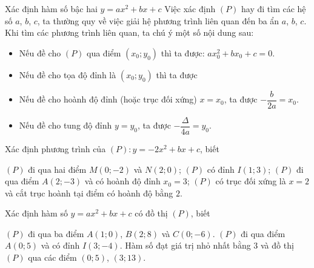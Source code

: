 \begin{dang}{Xác định hàm số bậc hai $y=ax^2+bx+c$}
	Việc xác định $(P)$ hay đi tìm các hệ số $a$, $b$, $c$, ta thường quy về việc giải hệ phương trình liên quan đến ba ẩn  $a$, $b$, $c$. Khi tìm các phương trình liên quan, ta chú ý một số nội dung sau:
	\begin{itemize}
		\item[\iconMT] Nếu đề cho $(P)$ qua điểm $(x_0;y_0)$ thì ta được: $ax_0^2+bx_0+c=0$.
		\item[\iconMT] Nếu đề cho tọa độ đỉnh là $(x_0;y_0)$ thì ta được
		\item[\iconMT] Nếu đề cho hoành độ đỉnh (hoặc trục đối xứng) $x=x_0$, ta được $-\dfrac{b}{2a}=x_0$.
		\item[\iconMT] Nếu đề cho tung độ đỉnh $y=y_0$, ta được $-\dfrac{\Delta}{4a}=y_0$.
	\end{itemize}
\end{dang}
\begin{vd}
	Xác định phương trình của $(P)\colon y=-2x^2+bx+c$, biết
	\begin{tasks}
		\task $(P)$ đi qua hai điểm $M(0;-2)$ và $N(2;0)$;
		\task $(P)$ có đỉnh $I(1;3)$;
		\task $(P)$ đi qua điểm $A(2;-3)$ và có hoành độ đỉnh $x_0=3$;
		\task $(P)$ có trục đối xứng là $x=2$ và cắt trục hoành tại điểm có hoành độ bằng $2$.
	\end{tasks}
\end{vd}

\begin{vd}
	Xác định hàm số $y=ax^2+bx+c$ có đồ thị $(P)$, biết 
	\begin{tasks}
		\task $(P)$ đi qua ba điểm $A(1;0)$, $B(2;8)$ và $C(0;-6)$.
		\task $(P)$ đi qua điểm $A(0;5)$ và có đỉnh $I(3;-4)$.
		\task Hàm số đạt giá trị nhỏ nhất bằng $3$ và đồ thị $(P)$ qua các điểm $(0;5)$, $(3;13)$.
	\end{tasks}
\end{vd}

